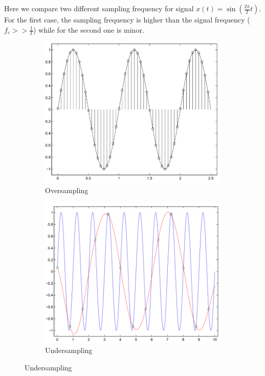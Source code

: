 \documentclass[10pt,a4paper]{report}
\theoremstyle{definition}
\begin{document}
Here we compare two different sampling frequency for signal $x(t)=\sin(\frac{2\pi}{T}t)$. For the first case, the sampling frequency is higher than the signal frequency ($f_{c} >> \frac{1}{T}$) while for the second one is minor.



\begin{figure}[h!]
	\centering
	\begin{subfigure}{.5\textwidth}
		\centering
		\includegraphics[width=.6\linewidth]{images/Pasted image 20230526142720.png}
		\caption{Oversampling}
		\label{sample-eg-1}
	\end{subfigure}%
	\begin{subfigure}{.5\textwidth}
		\centering
		\includegraphics[width=.6\linewidth]{images/Pasted image 20230526142733.png}
		\caption{Undersampling}
		\label{sample-eg-1-reconstruct}
	\end{subfigure}
	
	
\end{figure}
\end{document}
